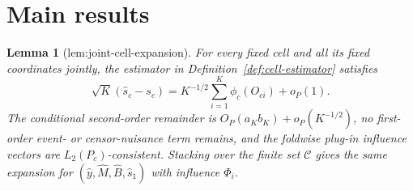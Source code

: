 \documentclass{article}
\newtheorem{lemma}{Lemma}
\begin{document}
\section{Main results}

\begin{lemma}[lem:joint-cell-expansion]\label{lem:joint-cell-expansion}
For every fixed cell and all its fixed coordinates jointly, the estimator in Definition~\ref{def:cell-estimator} satisfies \[\sqrt K(\widehat s_c-s_c)=K^{-1/2}\sum_{i=1}^K\phi_c(O_{ci})+o_P(1).\] The conditional second-order remainder is \(O_P(a_Kb_K)+o_P(K^{-1/2})\), no first-order event- or censor-nuisance term remains, and the foldwise plug-in influence vectors are \(L_2(P_c)\)-consistent. Stacking over the finite set \(\mathcal C\) gives the same expansion for \((\widehat y,\widehat M,\widehat B,\widehat s_1)\) with influence \(\Phi_i\).
\end{lemma}
\end{document}
